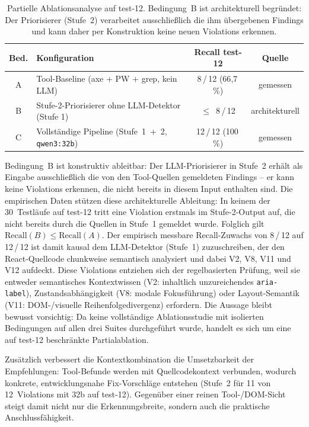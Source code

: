 \begin{table}[htbp]
\centering
\small
\renewcommand{\arraystretch}{1.15}
\begin{tabular}{@{}clcc@{}}
\toprule
\textbf{Bed.} & \textbf{Konfiguration} & \textbf{Recall test-12} & \textbf{Quelle} \\
\midrule
A & Tool-Baseline (axe + PW + grep, kein \ac{LLM})      & 8\,/\,12 (66{,}7\,\%) & gemessen \\
B & Stufe-2-Priorisierer ohne \ac{LLM}-Detektor (Stufe 1)& $\leq$~8\,/\,12       & architekturell \\
C & Vollständige Pipeline (Stufe~1~+~2, \texttt{qwen3:32b}) & 12\,/\,12 (100\,\%) & gemessen \\
\bottomrule
\end{tabular}
\caption[Partielle Ablationsanalyse: Recall-Beitrag der Pipeline-Stufen]{Partielle Ablationsanalyse auf test-12. Bedingung~B ist architekturell begründet: Der Priorisierer (Stufe~2) verarbeitet ausschließlich die ihm übergebenen Findings und kann daher per Konstruktion keine neuen Violations erkennen.}
\label{tab:ablation}
\end{table}

Bedingung~B ist konstruktiv ableitbar: Der \ac{LLM}-Priorisierer in Stufe~2 
erhält als Eingabe ausschließlich die von den Tool-Quellen gemeldeten 
Findings -- er kann keine Violations erkennen, die nicht bereits in diesem 
Input enthalten sind. Die empirischen Daten stützen diese architekturelle 
Ableitung: In keinem der 30~Testläufe auf test-12 tritt eine Violation erstmals im Stufe-2-Output auf, die nicht bereits durch die Quellen in Stufe~1 gemeldet wurde. Folglich gilt $\text{Recall}(B) \leq \text{Recall}(A)$. Der empirisch messbare Recall-Zuwachs von 8\,/\,12 auf 12\,/\,12 ist damit kausal dem \ac{LLM}-Detektor (Stufe~1) zuzuschreiben, der den React-Quellcode 
chunkweise semantisch analysiert und dabei V2, V8, V11 und V12 aufdeckt. 
Diese Violations entziehen sich der regelbasierten Prüfung, weil sie  entweder semantisches Kontextwissen (V2: inhaltlich unzureichendes \texttt{aria-label}), Zustands\-abhängigkeit (V8: modale Fokusführung) oder Layout-Semantik (V11: \ac{DOM}-/visuelle Reihenfolgedivergenz) erfordern. Die Aussage bleibt bewusst vorsichtig: Da keine vollständige Ablationsstudie mit isolierten Bedingungen auf allen drei Suites durchgeführt wurde, handelt es sich um eine auf test-12 beschränkte Partialablation.

Zusätzlich verbessert die Kontextkombination die Umsetzbarkeit der Empfehlungen: Tool-Befunde werden mit Quellcodekontext verbunden, wodurch konkrete, entwicklungsnahe Fix-Vorschläge entstehen (Stufe~2 für 11 von 12~Violations mit 32b auf test-12). Gegenüber einer reinen Tool-/\ac{DOM}-Sicht steigt damit nicht nur die Erkennungsbreite, sondern auch die praktische Anschlussfähigkeit.

